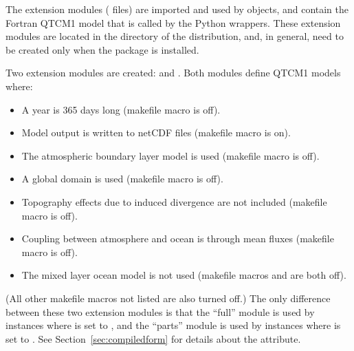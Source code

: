 %


%

The extension modules ( files) are imported and used by
 objects, and contain the Fortran QTCM1 model that is
called by the  Python wrappers.  These extension modules
are located in the  directory of the  distribution,
and, in general, need to be created only when the  package
is installed.

Two extension modules are created:   and
.  Both modules define QTCM1 models where:

\begin{itemize}
\item A year is 365 days long 
	(makefile macro  is off).
\item Model output is written to netCDF files
	(makefile macro  is on).
\item The atmospheric boundary layer model is used
	(makefile macro  is off).
\item A global domain is used
	(makefile macro  is off).
\item Topography effects due to induced divergence are not included
	(makefile macro  is off).
\item Coupling between atmosphere and ocean is through mean fluxes
	(makefile macro  is off).
\item The mixed layer ocean model is not used
	(makefile macros  and  are both off).
\end{itemize}

(All other makefile macros not listed are also turned off.)
The only difference between these two extension modules is that the
``full'' module is used by  instances where
 is set to , and the ``parts''
module is used by  instances where 
is set to .  See Section~\ref{sec:compiledform} for
details about the  attribute.


